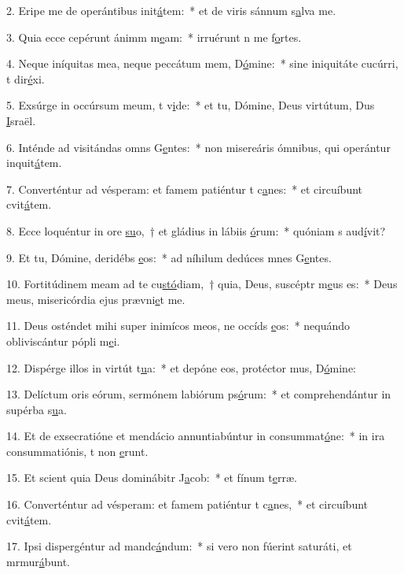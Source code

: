 2. Eripe me de operántibus init\uline{á}tem:~* et de viris sánnum s\uline{a}lva me.\par 
3. Quia ecce cepérunt ánimm m\uline{e}am:~* irruérunt n me f\uline{o}rtes.\par 
4. Neque iníquitas mea, neque peccátum mem, D\uline{ó}mine:~* sine iniquitáte cucúrri, t dir\uline{é}xi.\par 
5. Exsúrge in occúrsum meum, t v\uline{i}de:~* et tu, Dómine, Deus virtútum, Dus \uline{I}sraël.\par 
6. Inténde ad visitándas omns G\uline{e}ntes:~* non misereáris ómnibus, qui operántur inquit\uline{á}tem.\par 
7. Converténtur ad vésperam: et famem patiéntur t c\uline{a}nes:~* et circuíbunt cvit\uline{á}tem.\par 
8. Ecce loquéntur in ore \uline{su}o,~† et gládius in lábiis \uline{ó}rum:~* quóniam s aud\uline{í}vit?\par 
9. Et tu, Dómine, deridébs \uline{e}os:~* ad níhilum dedúces mnes G\uline{e}ntes.\par 
10. Fortitúdinem meam ad te cu\uline{stó}diam,~† quia, Deus, suscéptr m\uline{e}us es:~* Deus meus, misericórdia ejus prævni\uline{e}t me.\par 
11. Deus osténdet mihi super inimícos meos, ne occíds \uline{e}os:~* nequándo obliviscántur pópli m\uline{e}i.\par 
12. Dispérge illos in virtút t\uline{u}a:~* et depóne eos, protéctor mus, D\uline{ó}mine:\par 
13. Delíctum oris eórum, sermónem labiórum ps\uline{ó}rum:~* et comprehendántur in supérba s\uline{u}a.\par 
14. Et de exsecratióne et mendácio annuntiabúntur in consummat\uline{ó}ne:~* in ira consummatiónis, t non \uline{e}runt.\par 
15. Et scient quia Deus dominábitr J\uline{a}cob:~* et fínum t\uline{e}rræ.\par 
16. Converténtur ad vésperam: et famem patiéntur t c\uline{a}nes,~* et circuíbunt cvit\uline{á}tem.\par 
17. Ipsi dispergéntur ad mandc\uline{á}ndum:~* si vero non fúerint saturáti, et mrmur\uline{á}bunt.\par 
